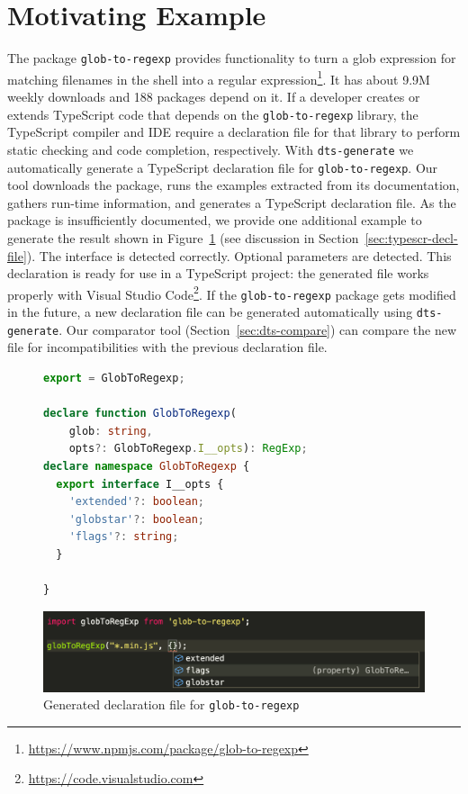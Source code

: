 \documentclass[sigplan,screen]{acmart}
\newcommand{\figref}[1]{Figure~\ref{#1}}
\begin{document}
\section{Motivating Example}
\label{sec:motivating-example}
The \NPM{} package \texttt{glob-to-regexp} provides functionality to turn a
glob expression for matching filenames in the shell into a regular
expression\footnote{\url{https://www.npmjs.com/package/glob-to-regexp}}. It 
has about 9.9M weekly downloads and 188 \NPM{} packages depend on it. If
a developer creates or extends TypeScript code that depends on the
\texttt{glob-to-regexp} library, the TypeScript
compiler and IDE require a declaration file for that library to
perform static checking and code completion, respectively. With
\texttt{dts-generate} we automatically generate a TypeScript
declaration file for \texttt{glob-to-regexp}. Our tool downloads the \NPM{} 
package, runs the examples extracted from its documentation, gathers
run-time information, and generates a TypeScript declaration
file. As the package is insufficiently documented, we provide one
additional example to generate the result 
shown in \figref{fig:motivating-example-glob-to-regexp-vscode} (see
discussion in Section~\ref{sec:typescr-decl-file}).  The interface is
detected correctly. Optional parameters are detected. This declaration is
ready for use in a TypeScript project:  the generated file works
properly with Visual Studio Code\footnote{\url{https://code.visualstudio.com}}. If the
\texttt{glob-to-regexp} package gets modified in the future, a new declaration
file can be generated automatically using
\texttt{dts-generate}. Our comparator tool (Section~\ref{sec:dts-compare}) can compare the new file
for incompatibilities with the previous declaration file.

\begin{figure}[tp]
  \centering
    \begin{lstlisting}[language=TypeScript,numbers=none]
export = GlobToRegexp;

declare function GlobToRegexp(
    glob: string, 
    opts?: GlobToRegexp.I__opts): RegExp;
declare namespace GlobToRegexp {
  export interface I__opts {
    'extended'?: boolean;
    'globstar'?: boolean;
    'flags'?: string;
  }

}
    \end{lstlisting}
  \begin{center}
    \includegraphics[width=\linewidth]{motivating-example-glob-to-regexp-vscode.png}
  \end{center}

  \caption{Generated declaration file for \texttt{glob-to-regexp}} 
  \label{fig:motivating-example-glob-to-regexp-vscode}
\end{figure}
\end{document}
